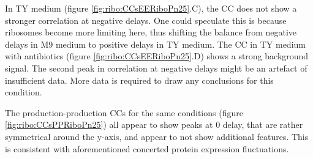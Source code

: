 In TY medium (figure \ref{fig:ribo:CCsEERiboPn25}.C), the CC does not show a stronger correlation at negative delays.
%
One could speculate this is because ribosomes become more limiting here, thus shifting the balance from negative delays in M9 medium to positive delays in TY medium.
%
The CC in TY medium with antibiotics (figure \ref{fig:ribo:CCsEERiboPn25}.D) shows a strong background signal.
The second peak in correlation at negative delays might be an artefact of insufficient data.
More data is required to draw any conclusions for this condition. 


The production-production CCs for the same conditions (figure \ref{fig:ribo:CCsPPRiboPn25}) all appear to show peaks at 0 delay, that are rather symmetrical around the y-axis, and appear to not show additional features.
This is consistent with aforementioned concerted protein expression fluctuations.



